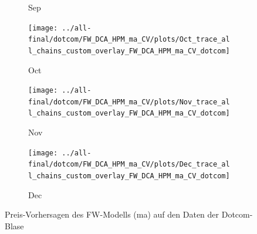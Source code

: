 \documentclass[ngerman]{ttlab-qualify}
\begin{document}
\begin{figure}[H]
\begin{subfigure}{.3\linewidth}
  \caption{Sep}
  \end{subfigure}\par\medskip
  \begin{subfigure}{.3\linewidth}
  \texttt{[image: ../all-final/dotcom/FW\_DCA\_HPM\_ma\_CV/plots/Oct\_trace\_all\_chains\_custom\_overlay\_FW\_DCA\_HPM\_ma\_CV\_dotcom]}\hfill
  \caption{Oct}
  \end{subfigure}
  \begin{subfigure}{.3\linewidth}
  \texttt{[image: ../all-final/dotcom/FW\_DCA\_HPM\_ma\_CV/plots/Nov\_trace\_all\_chains\_custom\_overlay\_FW\_DCA\_HPM\_ma\_CV\_dotcom]}\hfill
  \caption{Nov}
  \end{subfigure}
  \begin{subfigure}{.3\linewidth}
  \texttt{[image: ../all-final/dotcom/FW\_DCA\_HPM\_ma\_CV/plots/Dec\_trace\_all\_chains\_custom\_overlay\_FW\_DCA\_HPM\_ma\_CV\_dotcom]}\hfill
  \caption{Dec}
  \end{subfigure}
  \caption{Preis-Vorhersagen des FW-Modells (ma) auf den Daten der Dotcom-Blase}
\end{figure}
\end{document}
